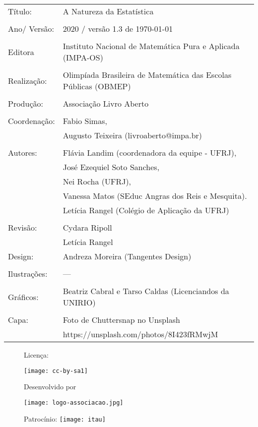 \begin{tabular}{p{}p{}}
Título: & A Natureza da Estatística\\
\\
Ano/ Versão: & 2020 / versão 1.3 de \today\\
\\
Editora & Instituto Nacional de Matem\'atica Pura e Aplicada (IMPA-OS)\\
\\
Realização:& Olimp\'iada Brasileira de Matem\'atica das Escolas P\'ublicas (OBMEP)\\
\\
Produção:& Associação Livro Aberto\\
\\
Coordenação: & Fabio Simas, \\
             & Augusto Teixeira (livroaberto@impa.br)\\
\\
  Autores: & Flávia Landim (coordenadora da equipe - UFRJ),\\
        & José Ezequiel Soto Sanches,\\
        & Nei Rocha (UFRJ),\\
             & Vanessa Matos (SEduc Angras dos Reis e Mesquita).\\
             & Letícia Rangel (Colégio de Aplicação da UFRJ)\\
\\
Revisão: &  Cydara Ripoll  \\
		 &  Letícia Rangel
\\
Design: & Andreza Moreira (Tangentes Design) \\
\\
  Ilustrações: & --- \\ 
\\
Gráficos: & Beatriz Cabral e Tarso Caldas (Licenciandos da UNIRIO)\\
\\
  Capa: & Foto de Chuttersnap no Unsplash \\
        & https://unsplash.com/photos/8I423fRMwjM \\

\end{tabular}



\begin{figure}[b]
\begin{minipage}[l]{5cm}
\centering

{\large Licença:}

  \texttt{[image: cc-by-sa1]}
\end{minipage}\hfill
\begin{minipage}[c]{5cm}
\centering
{\large Desenvolvido por}

\texttt{[image: logo-associacao.jpg]}
\end{minipage}
\begin{minipage}[r]{5cm}
\centering

{\large Patrocínio:}
  \vspace{1em}
  \texttt{[image: itau]}
\end{minipage}
\end{figure}


